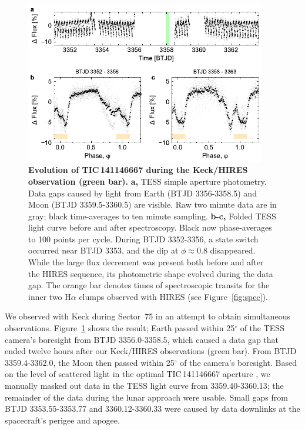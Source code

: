 \documentclass[11pt,twocolumn,tighten,linenumbers]{aastex7}
\begin{document}
\begin{figure}[!t]
  \centering
  \includegraphics[width=0.935\textwidth]{figures/sf1.pdf}
  \vspace{-0.2cm}
  \caption{{\bf Evolution of TIC\,141146667 during the Keck/HIRES
  observation (green bar).}  {\bf a,} TESS simple aperture photometry.
  Data gaps caused by light from Earth (BTJD 3356-3358.5) and Moon
  (BTJD 3359.5-3360.5) are visible.  Raw two minute
  data are in gray; black time-averages to ten minute sampling.  {\bf
  b-c,} Folded TESS light curve before and after spectroscopy.  Black
  now phase-averages to 100 points per
  cycle.  During BTJD 3352-3356, a state switch occurred near BTJD
  3353, and the dip at $\phi$$\approx$0.8 disappeared.  While the
  large flux decrement was present both before and after the HIRES
  sequence, its photometric shape evolved during the data gap.  The
  orange bar denotes times of spectroscopic transits for the inner two
  H$\alpha$ clumps observed with HIRES (see Figure~\ref{fig:spec}).}
  \label{fig:fulllc}
\end{figure}


We observed with Keck during Sector~75 in an attempt to obtain
simultaneous observations.   Figure~\ref{fig:fulllc} shows the result;
Earth passed within 25$^\circ$ of the
TESS camera's boresight from BTJD 3356.0-3358.5, which caused a data
gap that ended twelve hours after our Keck/HIRES observations
(green bar).  From
BTJD 3359.4-3362.0, the Moon then passed within 25$^\circ$ of the
camera's boresight.  Based on the level of scattered light in the
optimal TIC\,141146667 aperture \citep{Jenkins2016}, we manually masked
out data in the TESS light curve from 3359.40-3360.13; the remainder
of the data during the lunar approach were usable.  Small gaps
from BTJD 3353.55-3353.77 and 3360.12-3360.33 were caused by
data downlinks at the spacecraft's perigee and apogee.
\end{document}
